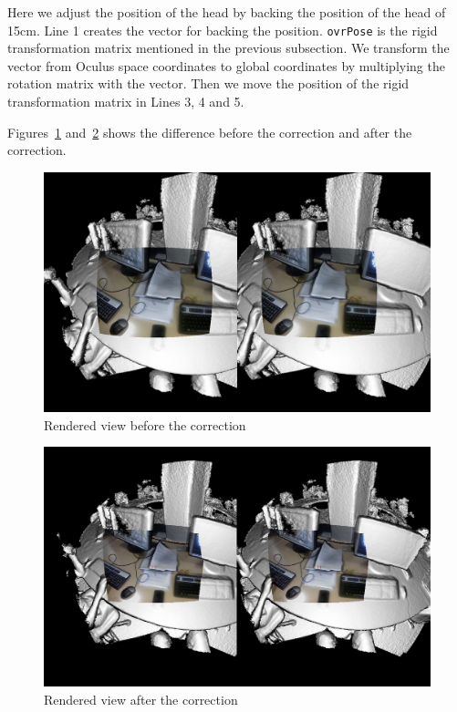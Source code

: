 \documentclass[12pt]{article}
\begin{document}
Here we adjust the position of the head by backing the position of the head of 15cm. Line 1 creates the vector for backing the position. \texttt{ovrPose} is the rigid transformation matrix mentioned in the previous subsection. We transform the vector from Oculus space coordinates to global coordinates by multiplying the rotation matrix with the vector. Then we move the position of the rigid transformation matrix in Lines 3, 4 and 5.

Figures~\ref{fig:notcorrect} and~\ref{fig:correct} shows the difference before the correction and after the correction.

\begin{figure}[!h]
  \centering
  \includegraphics[scale=0.3]{NotCorrected.png}
  \caption{\label{fig:notcorrect} Rendered view before the correction}
\end{figure}

\begin{figure}[!h]
  \centering
  \includegraphics[scale=0.3]{Corrected.png}
  \caption{\label{fig:correct} Rendered view after the correction}
\end{figure}
\end{document}
